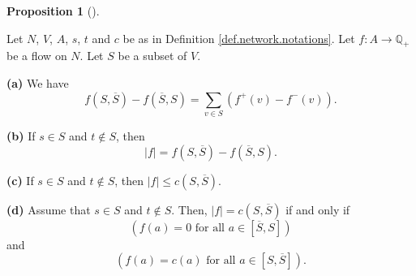 \documentclass[numbers=enddot,12pt,final,onecolumn,notitlepage]{scrartcl}%
\theoremstyle{definition}
\newtheorem{prop}[theo]{Proposition}
\newenvironment{proposition}[1][]
{\begin{prop}[#1]\begin{leftbar}}
{\end{leftbar}\end{prop}}
\let\sumnonlimits\sum
\renewcommand{\sum}{\sumnonlimits\limits}
\begin{document}
\begin{proposition}
\label{prop.2}Let $N$, $V$, $A$, $s$, $t$ and $c$ be as in Definition
\ref{def.network.notations}. Let $f:A\rightarrow\mathbb{Q}_{+}$ be a flow on
$N$. Let $S$ be a subset of $V$.

\textbf{(a)} We have%
\[
f\left(  S,\overline{S}\right)  -f\left(  \overline{S},S\right)  =\sum_{v\in
S}\left(  f^{+}\left(  v\right)  -f^{-}\left(  v\right)  \right)  .
\]


\textbf{(b)} If $s\in S$ and $t\notin S$, then%
\[
\left\vert f\right\vert =f\left(  S,\overline{S}\right)  -f\left(
\overline{S},S\right)  .
\]


\textbf{(c)} If $s\in S$ and $t\notin S$, then $\left\vert f\right\vert \leq
c\left(  S,\overline{S}\right)  $.

\textbf{(d)} Assume that $s\in S$ and $t\notin S$. Then, $\left\vert
f\right\vert =c\left(  S,\overline{S}\right)  $ if and only if%
\begin{equation}
\left(  f\left(  a\right)  =0\text{ for all }a\in\left[  \overline
{S},S\right]  \right)  \label{eq.prop.2.d.b.1}%
\end{equation}
and%
\begin{equation}
\left(  f\left(  a\right)  =c\left(  a\right)  \text{ for all }a\in\left[
S,\overline{S}\right]  \right)  . \label{eq.prop.2.d.b.2}%
\end{equation}

\end{proposition}
\end{document}
